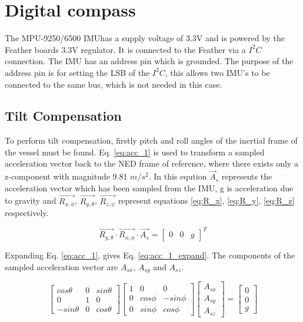 \section{Digital compass}
The MPU-9250/6500 IMUhas a supply voltage of 3.3V and is powered by the Feather boards 3.3V regulator. It is connected to the Feather via a $I^{2}C$ connection. The IMU has an address pin 
which is grounded. The purpose of the address pin is for setting the LSB of the $I^{2}C$, this allows two IMU's to be connected to the same bus, which is not needed in this case. 

\subsection{Tilt Compensation}
To perform tilt compensation, firstly pitch and roll angles of the inertial frame of the vessel must be found. Eq. \ref{eq:acc_1} is used to transform a sampled acceleration vector back to 
the NED frame of reference, where there exists only a z-component with magnitude 9.81 $m/s^2$. In this eqution $\vec{A}_s$ represents the acceleration vector which has been 
sampled from the IMU, g is acceleration due to gravity and $\vec{R_{x,\phi}}$, $\vec{R_{y,\theta}}$, $\vec{R_{z,\psi}}$ represent equations \ref{eq:R_x}, \ref{eq:R_y}, \ref{eq:R_z} 
respectively. 

\begin{equation}
    \label{eq:acc_1}
    \vec{R_{y,\theta}} \cdot \vec{R_{x,\phi}} \cdot \vec{A_s} = \begin{bmatrix} 0 & 0 & g \end{bmatrix}^T
\end{equation}

Expanding Eq. \ref{eq:acc_1}, gives Eq. \ref{eq:acc_1_expand}. The components of the sampled acceleration vector are $A_{sx}$, $A_{sy}$ and $A_{sz}$.

\begin{equation}
    \label{eq:acc_2}
    \begin{bmatrix} cos\theta & 0 & sin\theta \\ 0 & 1 & 0 \\ -sin\theta & 0 & cos\theta \end{bmatrix} \begin{bmatrix} 1 & 0 & 0 \\ 0 & cos\phi & -sin\phi \\ 0 & sin\phi & cos\phi \end{bmatrix} \begin{bmatrix} A_{sx} \\ A_{sy} \\ A_{sz} \end{bmatrix}= \begin{bmatrix} 0 \\ 0 \\ g \end{bmatrix}
\end{equation}

